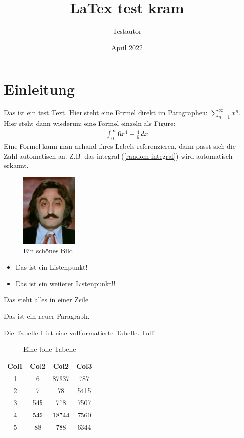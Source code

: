 \documentclass[12pt]{article}
\title{LaTex test kram}
\author{Testautor}
\date{April 2022}
\begin{document}
\maketitle

\pagebreak
\section{Einleitung}
Das ist ein test Text. Hier steht eine Formel direkt im Paragraphen: 
$\sum_{n = 1}^{\infty} x^n$. Hier steht dann wiederum eine Formel einzeln als Figure:
\begin{align}
  \int_{0}^{\infty} 6x^4-\frac{4}{6} \,dx \label{random integral}
\end{align}
Eine Formel kann man anhand ihres Labels referenzieren, dann passt sich
die Zahl automatisch an. Z.B. das integral (\ref{random integral}) wird automatisch
erkannt. \linebreak

\begin{figure}[h]
  \centering
  \includegraphics[width=0.25\textwidth]{Bilder/Unvernichtet.jpg}
  \caption{Ein schönes Bild}
  \label{fig:mesh1}
\end{figure}

\begin{itemize}
  \item Das ist ein Listenpunkt!
  \item Das ist ein weiterer Listenpunkt!!
\end{itemize}
Das steht alles in
einer Zeile

Das ist ein neuer Paragraph.
\pagebreak

Die Tabelle \ref{table:data} ist eine vollformatierte Tabelle. Toll!
\begin{table}[h!]
\centering
\begin{tabular}{||c c c c||} 
 \hline
 Col1 & Col2 & Col2 & Col3 \\ [0.5ex] 
 \hline\hline
 1 & 6 & 87837 & 787 \\ 
 2 & 7 & 78 & 5415 \\
 3 & 545 & 778 & 7507 \\
 4 & 545 & 18744 & 7560 \\
 5 & 88 & 788 & 6344 \\ [1ex] 
 \hline
\end{tabular}
\caption{Eine tolle Tabelle}
\label{table:data}
\end{table}
\end{document}
